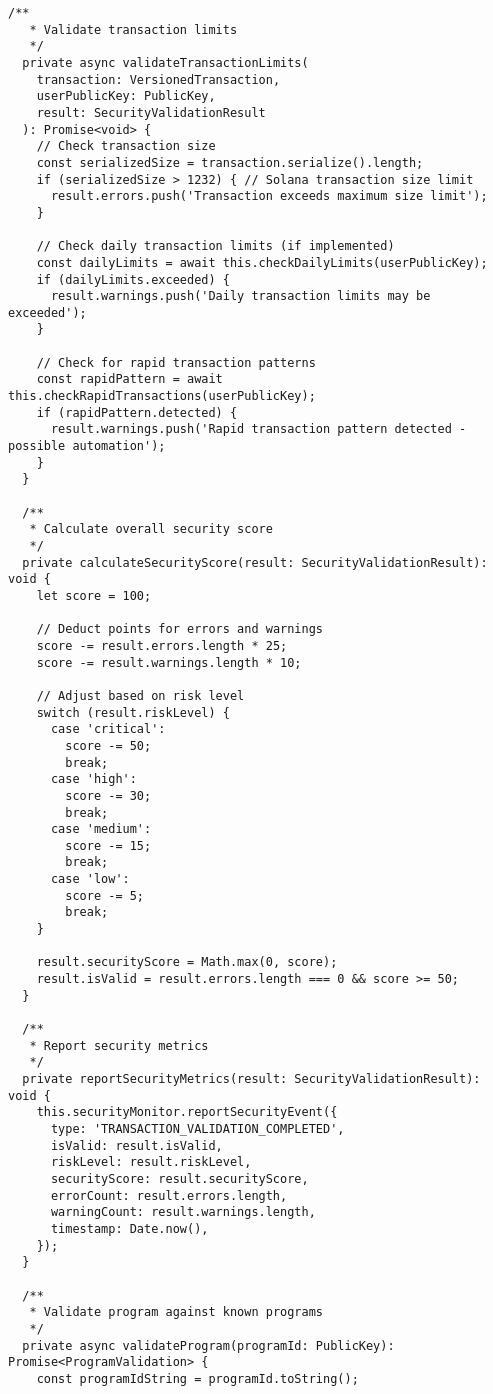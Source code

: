 \documentclass[11pt,a4paper]{article}
\begin{document}
\begin{lstlisting}[style=typescript, caption=Comprehensive Transaction Security]
  /**
   * Validate transaction limits
   */
  private async validateTransactionLimits(
    transaction: VersionedTransaction,
    userPublicKey: PublicKey,
    result: SecurityValidationResult
  ): Promise<void> {
    // Check transaction size
    const serializedSize = transaction.serialize().length;
    if (serializedSize > 1232) { // Solana transaction size limit
      result.errors.push('Transaction exceeds maximum size limit');
    }

    // Check daily transaction limits (if implemented)
    const dailyLimits = await this.checkDailyLimits(userPublicKey);
    if (dailyLimits.exceeded) {
      result.warnings.push('Daily transaction limits may be exceeded');
    }

    // Check for rapid transaction patterns
    const rapidPattern = await this.checkRapidTransactions(userPublicKey);
    if (rapidPattern.detected) {
      result.warnings.push('Rapid transaction pattern detected - possible automation');
    }
  }

  /**
   * Calculate overall security score
   */
  private calculateSecurityScore(result: SecurityValidationResult): void {
    let score = 100;

    // Deduct points for errors and warnings
    score -= result.errors.length * 25;
    score -= result.warnings.length * 10;

    // Adjust based on risk level
    switch (result.riskLevel) {
      case 'critical':
        score -= 50;
        break;
      case 'high':
        score -= 30;
        break;
      case 'medium':
        score -= 15;
        break;
      case 'low':
        score -= 5;
        break;
    }

    result.securityScore = Math.max(0, score);
    result.isValid = result.errors.length === 0 && score >= 50;
  }

  /**
   * Report security metrics
   */
  private reportSecurityMetrics(result: SecurityValidationResult): void {
    this.securityMonitor.reportSecurityEvent({
      type: 'TRANSACTION_VALIDATION_COMPLETED',
      isValid: result.isValid,
      riskLevel: result.riskLevel,
      securityScore: result.securityScore,
      errorCount: result.errors.length,
      warningCount: result.warnings.length,
      timestamp: Date.now(),
    });
  }

  /**
   * Validate program against known programs
   */
  private async validateProgram(programId: PublicKey): Promise<ProgramValidation> {
    const programIdString = programId.toString();


\end{lstlisting}
\end{document}
